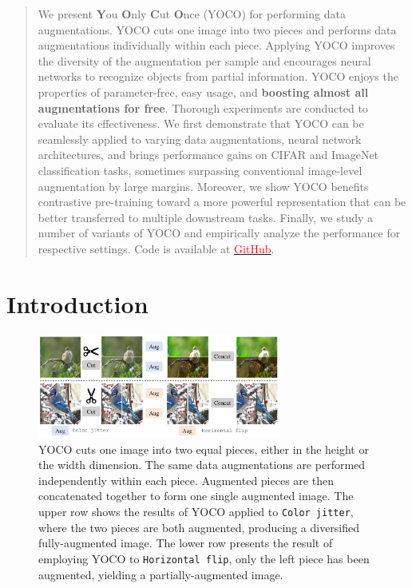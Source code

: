 \documentclass{article}
\newcommand{\re}[1]{\textcolor{red}{#1}}
\begin{document}
\begin{abstract}
We present \textbf{Y}ou \textbf{O}nly \textbf{C}ut \textbf{O}nce (YOCO) for performing data augmentations. YOCO cuts one image into two pieces and performs data augmentations individually within each piece. Applying YOCO improves the diversity of the augmentation per sample and encourages neural networks to recognize objects from partial information. YOCO enjoys the properties of parameter-free, easy usage, and \textbf{boosting almost all augmentations for free}. Thorough experiments are conducted to evaluate its effectiveness. We first demonstrate that YOCO can be seamlessly applied to varying data augmentations, neural network architectures, and brings performance gains on CIFAR and ImageNet classification tasks, sometimes surpassing conventional image-level augmentation by large margins. Moreover, we show YOCO benefits contrastive pre-training toward a more powerful representation that can be better transferred to multiple downstream tasks. Finally, we study a number of variants of YOCO and empirically analyze the performance for respective settings. 
Code is available at {\href{https://github.com/JunlinHan/YOCO}{\re{GitHub}}}.

\end{abstract}
\section{Introduction}

\begin{figure}[htb]
     \centering
     \includegraphics[width = 8cm]
     {figures/ppline.pdf}
     \caption{YOCO cuts one image into two equal pieces, either in the height or the width dimension. The same data augmentations are performed independently within each piece. Augmented pieces are then concatenated together to form one single augmented image. The upper row shows the results of YOCO applied to \texttt{Color jitter}, where the two pieces are both augmented, producing a diversified fully-augmented image. The lower row presents the result of employing YOCO to \texttt{Horizontal flip}, only the left piece has been augmented, yielding a partially-augmented image.   }
     \label{fig:ppline}
\end{figure}
\end{document}
